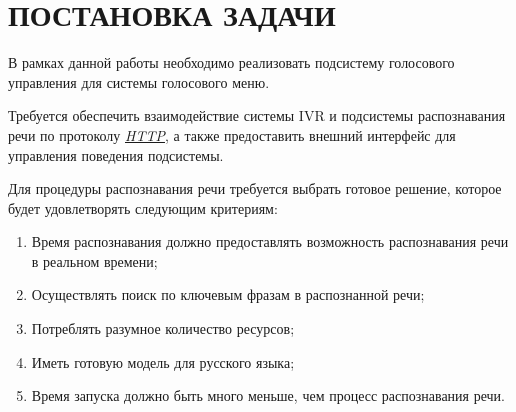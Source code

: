 \chapter{ПОСТАНОВКА ЗАДАЧИ}

В рамках данной работы необходимо реализовать подсистему голосового управления
для системы голосового меню.

Требуется обеспечить взаимодействие системы IVR и подсистемы распознавания речи
по протоколу \hyperlink{http}{\textit{HTTP}}, а также предоставить внешний
интерфейс для управления поведения подсистемы.

Для процедуры распознавания речи требуется выбрать готовое решение, которое будет
удовлетворять следующим критериям:
\begin{enumerate} \label{enum:asr:cond}
    \item Время распознавания должно предоставлять возможность \linebreak
        распознавания речи в реальном времени;
    \item Осуществлять поиск по ключевым фразам в распознанной речи;
    \item Потреблять разумное количество ресурсов;
    \item Иметь готовую модель для русского языка;
    \item Время запуска должно быть много меньше, чем процесс распознавания речи.
\end{enumerate}
